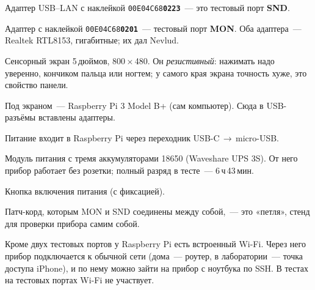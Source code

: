 \documentclass[a4paper,11pt]{article}
\begin{document}
\begin{callouts}
\item Адаптер USB--LAN с наклейкой \texttt{00E04C68\textbf{0223}}~--- это тестовый порт \textbf{SND}.
\item Адаптер с наклейкой \texttt{00E04C68\textbf{0201}}~--- тестовый порт \textbf{MON}. Оба адаптера~---
  Realtek RTL8153, гигабитные; их дал Nevlud.
\item Сенсорный экран 5\,дюймов, 800\,×\,480. Он \emph{резистивный}: нажимать надо уверенно, кончиком
  пальца или ногтем; у самого края экрана точность хуже, это свойство панели.
\item Под экраном~--- Raspberry Pi 3 Model B+ (сам компьютер). Сюда в USB-разъёмы вставлены адаптеры.
\item Питание входит в Raspberry Pi через переходник USB-C\,$\rightarrow$\,micro-USB.
\item Модуль питания с тремя аккумуляторами 18650 (Waveshare UPS 3S). От него прибор работает без
  розетки; полный разряд в тесте~--- 6\,ч\,43\,мин.
\item Кнопка включения питания (с фиксацией).
\item Патч-корд, которым MON и SND соединены между собой,~--- это «петля», стенд для проверки прибора
  самим собой.
\end{callouts}

Кроме двух тестовых портов у Raspberry Pi есть встроенный Wi-Fi. Через него прибор подключается к
обычной сети (дома~--- роутер, в лаборатории~--- точка доступа iPhone), и по нему можно зайти на прибор с
ноутбука по SSH. В тестах на тестовых портах Wi-Fi не участвует.
\end{document}
